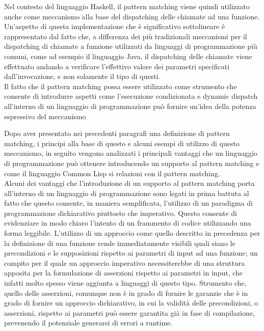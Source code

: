 Nel contesto del linguaggio Haskell, il pattern matching viene quindi
utilizzato anche come meccanismo alla base del dispatching delle chiamate ad
una funzione. Un’aspetto di questa implementazione che è significativo
sottolineare è rappresentato dal fatto che, a differenza dei più tradizionali
meccanismi per il dispatching di chiamate a funzione utilizzati da linguaggi di
programmazione più comuni, come ad esempio il linguaggio Java, il dispatching
delle chiamate viene effettuato andando a verificare l’effettivo valore dei
parametri specificati dall’invocazione, e non solamente il tipo di questi.\\

Il fatto che il pattern matching possa essere utilizzato come strumento che
consente di introdurre aspetti come l’esecuzione condizionata e dynamic
dispatch all’interno di un linguaggio di programmazione può fornire un’idea
della potenza espressivo del meccanismo

Dopo aver presentato nei precedenti paragrafi una definizione di pattern
matching, i principi alla base di questo e alcuni esempi di utilizzo di questo
meccanismo, in seguito vengono analizzati i principali vantaggi che un
linguaggio di programmazione può ottenere introducendo un supporto al pattern
matching e come il linguaggio Common Lisp si relazioni con il pattern 
matching.\\

Alcuni dei vantaggi che l'introduzione di un supporto al pattern matching porta
all’interno di un linguaggio di programmazione sono legati in prima battuta al
fatto che questo consente, in maniera semplificata, l’utilizzo di un paradigma
di programmazione dichiarativo piuttosto che imperativo. Questo consente di
evidenziare in modo chiaro l’intento di un frammento di codice utilizzando una
forma leggibile. L’utilizzo di un approccio come quello descritto in precedenza
per la definizione di una funzione rende immediatamente visibili quali siano le
precondizioni e le supposizioni rispetto ai parametri di input ad una funzione;
un compito per il quale un approccio imperativo necessiterebbe di una struttura
apposita per la formulazione di asserzioni rispetto ai parametri in input, che
infatti molto spesso viene aggiunta a linguaggi di questo tipo. Strumento che,
quello delle asserzioni, comunque non è in grado di fornire le garanzie che è
in grado di fornire un approccio dichiarativo, in cui la validità delle
precondizioni, o asserzioni, rispetto ai parametri può essere garantita già in
fase di compilazione, prevenendo il potenziale generarsi di errori a runtime.\\

